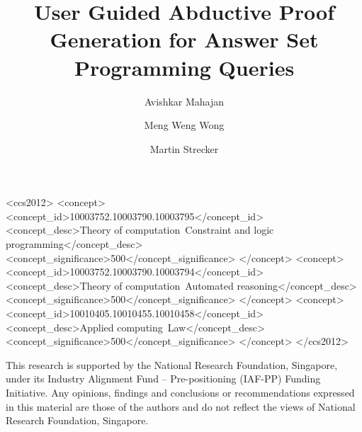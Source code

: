 \documentclass[sigconf]{acmart}
\begin{document}
\title{User Guided Abductive Proof Generation for Answer Set Programming
  Queries}

\author{Avishkar Mahajan}
\author{Meng Weng Wong}

\author{Martin Strecker}



\begin{CCSXML}
<ccs2012>
   <concept>
       <concept_id>10003752.10003790.10003795</concept_id>
       <concept_desc>Theory of computation~Constraint and logic programming</concept_desc>
       <concept_significance>500</concept_significance>
       </concept>
   <concept>
       <concept_id>10003752.10003790.10003794</concept_id>
       <concept_desc>Theory of computation~Automated reasoning</concept_desc>
       <concept_significance>500</concept_significance>
       </concept>
   <concept>
       <concept_id>10010405.10010455.10010458</concept_id>
       <concept_desc>Applied computing~Law</concept_desc>
       <concept_significance>500</concept_significance>
       </concept>
 </ccs2012>
\end{CCSXML}


\maketitle
















%



\begin{acks}
  This research is supported by the National Research Foundation, Singapore,
  under its Industry Alignment Fund -- Pre-positioning (IAF-PP) Funding
  Initiative. Any opinions, findings and conclusions or recommendations
  expressed in this material are those of the authors and do not reflect the
  views of National Research Foundation, Singapore.
\end{acks}
  


\end{document}
